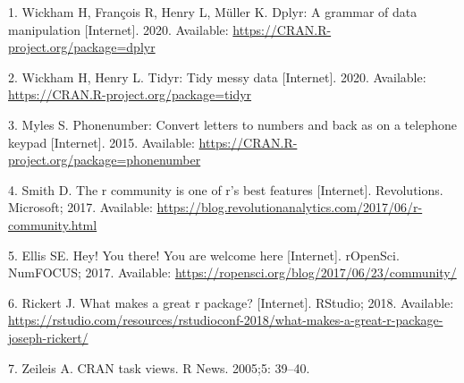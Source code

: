 \documentclass[10pt,letterpaper]{article}
\begin{document}
\hypertarget{refs}{}
\leavevmode\hypertarget{ref-dplyr}{}%
1. Wickham H, François R, Henry L, Müller K. Dplyr: A grammar of data
manipulation {[}Internet{]}. 2020. Available:
\url{https://CRAN.R-project.org/package=dplyr}

\leavevmode\hypertarget{ref-tidyr}{}%
2. Wickham H, Henry L. Tidyr: Tidy messy data {[}Internet{]}. 2020.
Available: \url{https://CRAN.R-project.org/package=tidyr}

\leavevmode\hypertarget{ref-phonenumber}{}%
3. Myles S. Phonenumber: Convert letters to numbers and back as on a
telephone keypad {[}Internet{]}. 2015. Available:
\url{https://CRAN.R-project.org/package=phonenumber}

\leavevmode\hypertarget{ref-smith_2017}{}%
4. Smith D. The r community is one of r's best features {[}Internet{]}.
Revolutions. Microsoft; 2017. Available:
\url{https://blog.revolutionanalytics.com/2017/06/r-community.html}

\leavevmode\hypertarget{ref-ellis_2017}{}%
5. Ellis SE. Hey! You there! You are welcome here {[}Internet{]}.
rOpenSci. NumFOCUS; 2017. Available:
\url{https://ropensci.org/blog/2017/06/23/community/}

\leavevmode\hypertarget{ref-rickert_2018}{}%
6. Rickert J. What makes a great r package? {[}Internet{]}. RStudio;
2018. Available:
\url{https://rstudio.com/resources/rstudioconf-2018/what-makes-a-great-r-package-joseph-rickert/}

\leavevmode\hypertarget{ref-zeileis_2005}{}%
7. Zeileis A. CRAN task views. R News. 2005;5: 39--40.

\nolinenumbers
\end{document}
